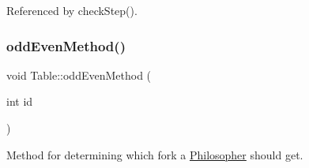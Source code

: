 Referenced by check\+Step().

\mbox{\label{class_table_a9a4f2d947df11a5c59f973a0b2e22094}} 
\subsubsection{\texorpdfstring{odd\+Even\+Method()}{oddEvenMethod()}}
{\footnotesize\ttfamily void Table\+::odd\+Even\+Method (\begin{DoxyParamCaption}\item[{int}]{id }\end{DoxyParamCaption})}



Method for determining which fork a \hyperlink{class_philosopher}{Philosopher} should get. 


